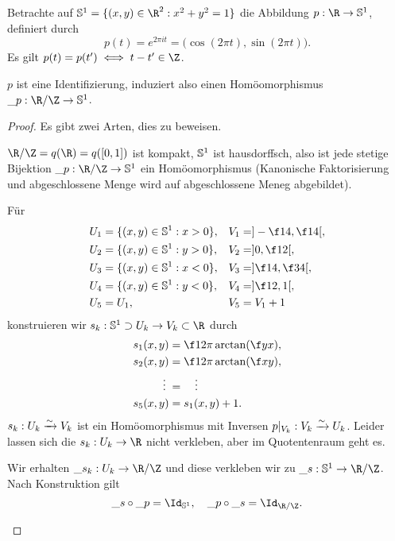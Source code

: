 \begin{ex}
	Betrachte auf $\S^1 = \{ (x,y) \in \R^2 : x^2 + y^2 = 1 \}$ die Abbildung $p: \R \to \S^1$, definiert durch
	\[
		p(t) = e^{2\pi i t} = \Big( \cos(2\pi t), \sin(2\pi t) \Big).
	\]
	Es gilt $p(t) = p(t') \iff t - t' \in \Z$.

	$p$ ist eine Identifizierung, induziert also einen Homöomorphismus $\_p : \R / \Z \to \S^1$.
	\begin{proof}
		Es gibt zwei Arten, dies zu beweisen.
		\begin{seg}
			$\R / \Z = q(\R) = q([0,1])$ ist kompakt, $\S^1$ ist hausdorffsch, also ist jede stetige Bijektion $\_p: \R / \Z \to \S^1$ ein Homöomorphismus (Kanonische Faktorisierung und abgeschlossene Menge wird auf abgeschlossene Meneg abgebildet).
		\end{seg}
		\begin{seg}
			Für
			\begin{align*}
				U_1 &= \{ (x,y) \in \S^1 : x > 0 \},&
				V_1 &= ] - \f 14, \f 14 [, \\
				U_2 &= \{ (x,y) \in \S^1 : y > 0 \},&
				V_2 &= ] 0, \f 12 [, \\
				U_3 &= \{ (x,y) \in \S^1 : x < 0 \},&
				V_3 &= ] \f 14, \f 34 [, \\
				U_4 &= \{ (x,y) \in \S^1 : y < 0 \},&
				V_4 &= ] \f 12, 1 [, \\
				U_5 &= U_1,&
				V_5 &= V_1 + 1
			\end{align*}
			konstruieren wir $s_k: \S^1 \supset U_k \to V_k \subset \R$ durch
			\begin{align*}
				s_1(x,y) &= \f 1{2\pi} \arctan(\f yx), \\
				s_2(x,y) &= \f 1{2\pi} \arctan(\f xy), \\
				\vdots\; &= \quad \vdots \\
				s_5(x,y) &= s_1(x,y) + 1.
			\end{align*}
			$s_k : U_k \homto V_k$ ist ein Homöomorphismus mit Inversen $p|_{V_k} : V_k \homto U_k$.
			Leider lassen sich die $s_k: U_k \to \R$ nicht verkleben, aber im Quotentenraum geht es.


			Wir erhalten $\_{s_k}: U_k \to \R / \Z$ und diese verkleben wir zu $\_s: \S^1 \to \R / \Z$.
			Nach Konstruktion gilt
			\[
				\_s \circ \_p = \Id_{\S^1}, \quad
				\_p \circ \_s = \Id_{\R / \Z}.
			\]
		\end{seg}
	\end{proof}
\end{ex}

